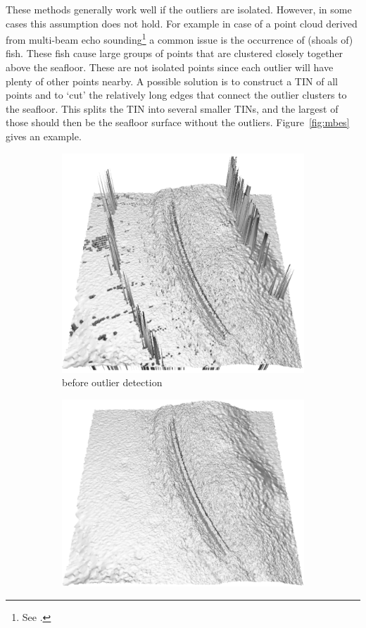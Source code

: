These methods generally work well if the outliers are isolated.
However, in some cases this assumption does not hold.
For example in case of a point cloud derived from multi-beam echo sounding\footnote{See .} a common issue is the occurrence of (shoals of) fish. 
These fish cause large groups of points that are clustered closely together above the seafloor.
These are not isolated points since each outlier will have plenty of other points nearby.
A possible solution is to construct a TIN of all points and to `cut' the relatively long edges that connect the outlier clusters to the seafloor.
This splits the TIN into several smaller TINs, and the largest of those should then be the seafloor surface without the outliers. 
Figure~\ref{fig:mbes} gives an example.
\begin{figure}
  \centering
  \begin{subfigure}[b]{0.4\linewidth}
    \centering
    \includegraphics[width=\textwidth]{figs/mbes_cleaning_before.png}
    \caption{before outlier detection}
  \end{subfigure}
  \qquad%
  \begin{subfigure}[b]{0.4\linewidth}
    \centering
    \includegraphics[width=\textwidth]{figs/mbes_cleaning_after.png}

\end{subfigure}
\end{figure}
